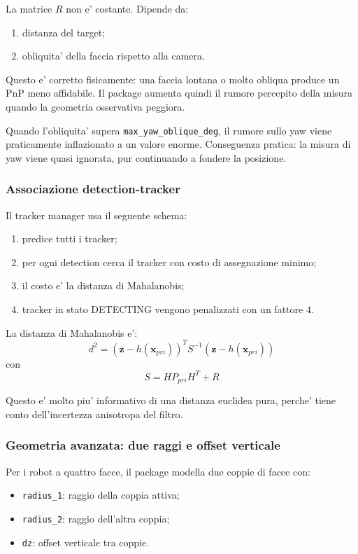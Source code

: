 \documentclass[11pt,a4paper]{article}
\newcommand{\code}[1]{\texttt{#1}}
\begin{document}
La matrice \(R\) non e' costante. Dipende da:
\begin{enumerate}[leftmargin=1.4em]
  \item distanza del target;
  \item obliquita' della faccia rispetto alla camera.
\end{enumerate}

Questo e' corretto fisicamente: una faccia lontana o molto obliqua produce un PnP meno affidabile. Il package aumenta quindi il rumore percepito della misura quando la geometria osservativa peggiora.

Quando l'obliquita' supera \code{max\_yaw\_oblique\_deg}, il rumore sullo yaw viene praticamente inflazionato a un valore enorme. Conseguenza pratica: la misura di yaw viene quasi ignorata, pur continuando a fondere la posizione.

\subsubsection{Associazione detection-tracker}

Il tracker manager usa il seguente schema:
\begin{enumerate}[leftmargin=1.4em]
  \item predice tutti i tracker;
  \item per ogni detection cerca il tracker con costo di assegnazione minimo;
  \item il costo e' la distanza di Mahalanobis;
  \item tracker in stato DETECTING vengono penalizzati con un fattore \(4\).
\end{enumerate}

La distanza di Mahalanobis e':
\begin{equation}
  d^2 = (\mathbf{z} - h(\mathbf{x}_{pri}))^T S^{-1} (\mathbf{z} - h(\mathbf{x}_{pri}))
\end{equation}
con
\begin{equation}
  S = H P_{pri} H^T + R
\end{equation}

Questo e' molto piu' informativo di una distanza euclidea pura, perche' tiene conto dell'incertezza anisotropa del filtro.

\subsubsection{Geometria avanzata: due raggi e offset verticale}

Per i robot a quattro facce, il package modella due coppie di facce con:
\begin{itemize}[leftmargin=1.4em]
  \item \code{radius\_1}: raggio della coppia attiva;
  \item \code{radius\_2}: raggio dell'altra coppia;
  \item \code{dz}: offset verticale tra coppie.
\end{itemize}
\end{document}
